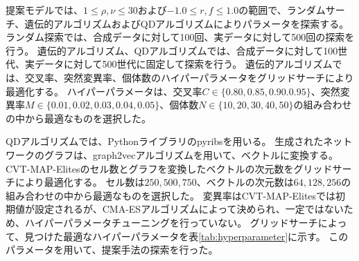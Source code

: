 \documentclass[uplatex,11pt,openany]{ujreport}
\begin{document}
        提案モデルでは、$1\leq \rho,\nu \leq30$および$-1.0\leq r,f\leq 1.0$の範囲で、ランダムサーチ、遺伝的アルゴリズムおよびQDアルゴリズムによりパラメータを探索する。
        ランダム探索では、合成データに対して100回、実データに対して500回の探索を行う。
        遺伝的アルゴリズム、QDアルゴリズムでは、合成データに対して100世代、実データに対して500世代に固定して探索を行う。
        遺伝的アルゴリズムでは、交叉率、突然変異率、個体数のハイパーパラメータをグリッドサーチにより最適化する。
        ハイパーパラメータは、交叉率$C\in\{0.80,0.85,0.90.0.95\}$、突然変異率$M\in\{0.01,0.02,0.03,0.04,0.05\}$、個体数$N\in\{10,20,30,40,50\}$の組み合わせの中から最適なものを選択した。

        QDアルゴリズムでは、Pythonライブラリのpyribs\cite{vassiliades_pyribs_2021}を用いる。
        生成されたネットワークのグラフは、graph2vecアルゴリズムを用いて、ベクトルに変換する。
        CVT-MAP-Elitesのセル数とグラフを変換したベクトルの次元数をグリッドサーチにより最適化する。
        セル数は$250,500,750$、ベクトルの次元数は$64,128,256$の組み合わせの中から最適なものを選択した。
        変異率はCVT-MAP-Elitesでは初期値が設定されるが、CMA-ESアルゴリズム\cite{}によって決められ、一定ではないため、ハイパーパラメータチューニングを行っていない。
        グリッドサーチによって、見つけた最適なハイパーパラメータを表\ref{tab:hyperparameter}に示す。
        このパラメータを用いて、提案手法の探索を行った。
\end{document}

